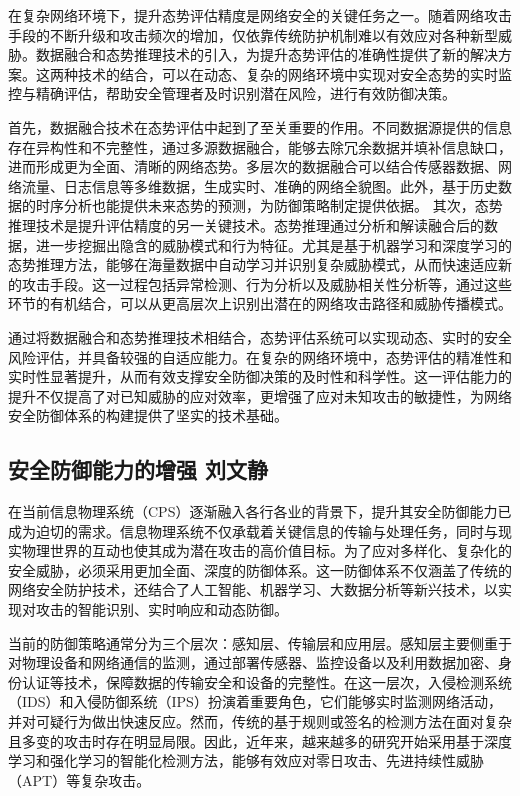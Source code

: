 在复杂网络环境下，提升态势评估精度是网络安全的关键任务之一。随着网络攻击手段的不断升级和攻击频次的增加，仅依靠传统防护机制难以有效应对各种新型威胁。数据融合和态势推理技术的引入，为提升态势评估的准确性提供了新的解决方案。这两种技术的结合，可以在动态、复杂的网络环境中实现对安全态势的实时监控与精确评估，帮助安全管理者及时识别潜在风险，进行有效防御决策。

首先，数据融合技术在态势评估中起到了至关重要的作用。不同数据源提供的信息存在异构性和不完整性，通过多源数据融合，能够去除冗余数据并填补信息缺口，进而形成更为全面、清晰的网络态势。多层次的数据融合可以结合传感器数据、网络流量、日志信息等多维数据，生成实时、准确的网络全貌图。此外，基于历史数据的时序分析也能提供未来态势的预测，为防御策略制定提供依据。
其次，态势推理技术是提升评估精度的另一关键技术。态势推理通过分析和解读融合后的数据，进一步挖掘出隐含的威胁模式和行为特征。尤其是基于机器学习和深度学习的态势推理方法，能够在海量数据中自动学习并识别复杂威胁模式，从而快速适应新的攻击手段。这一过程包括异常检测、行为分析以及威胁相关性分析等，通过这些环节的有机结合，可以从更高层次上识别出潜在的网络攻击路径和威胁传播模式。

通过将数据融合和态势推理技术相结合，态势评估系统可以实现动态、实时的安全风险评估，并具备较强的自适应能力。在复杂的网络环境中，态势评估的精准性和实时性显著提升，从而有效支撑安全防御决策的及时性和科学性。这一评估能力的提升不仅提高了对已知威胁的应对效率，更增强了应对未知攻击的敏捷性，为网络安全防御体系的构建提供了坚实的技术基础。

\subsection{安全防御能力的增强 刘文静}

在当前信息物理系统（CPS）逐渐融入各行各业的背景下，提升其安全防御能力已成为迫切的需求。信息物理系统不仅承载着关键信息的传输与处理任务，同时与现实物理世界的互动也使其成为潜在攻击的高价值目标。为了应对多样化、复杂化的安全威胁，必须采用更加全面、深度的防御体系。这一防御体系不仅涵盖了传统的网络安全防护技术，还结合了人工智能、机器学习、大数据分析等新兴技术，以实现对攻击的智能识别、实时响应和动态防御。

当前的防御策略通常分为三个层次：感知层、传输层和应用层。感知层主要侧重于对物理设备和网络通信的监测，通过部署传感器、监控设备以及利用数据加密、身份认证等技术，保障数据的传输安全和设备的完整性。在这一层次，入侵检测系统（IDS）和入侵防御系统（IPS）扮演着重要角色，它们能够实时监测网络活动，并对可疑行为做出快速反应。然而，传统的基于规则或签名的检测方法在面对复杂且多变的攻击时存在明显局限。因此，近年来，越来越多的研究开始采用基于深度学习和强化学习的智能化检测方法，能够有效应对零日攻击、先进持续性威胁（APT）等复杂攻击。

